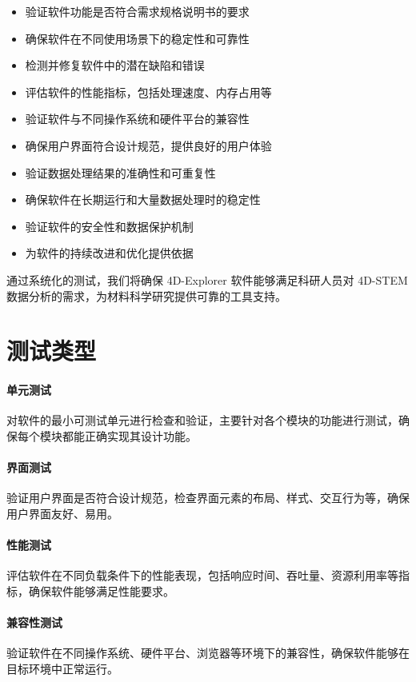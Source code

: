 \documentclass[a4paper,12pt]{report}	%
\begin{document}
\begin{itemize}
    \item 验证软件功能是否符合需求规格说明书的要求
    \item 确保软件在不同使用场景下的稳定性和可靠性
    \item 检测并修复软件中的潜在缺陷和错误
    \item 评估软件的性能指标，包括处理速度、内存占用等
    \item 验证软件与不同操作系统和硬件平台的兼容性
    \item 确保用户界面符合设计规范，提供良好的用户体验
    \item 验证数据处理结果的准确性和可重复性
    \item 确保软件在长期运行和大量数据处理时的稳定性
    \item 验证软件的安全性和数据保护机制
    \item 为软件的持续改进和优化提供依据
\end{itemize}

通过系统化的测试，我们将确保 4D-Explorer 软件能够满足科研人员对 4D-STEM 数据分析的需求，为材料科学研究提供可靠的工具支持。


\section{测试类型}

\paragraph{单元测试}
对软件的最小可测试单元进行检查和验证，主要针对各个模块的功能进行测试，确保每个模块都能正确实现其设计功能。

\paragraph{界面测试}
验证用户界面是否符合设计规范，检查界面元素的布局、样式、交互行为等，确保用户界面友好、易用。

\paragraph{性能测试}
评估软件在不同负载条件下的性能表现，包括响应时间、吞吐量、资源利用率等指标，确保软件能够满足性能要求。

\paragraph{兼容性测试}
验证软件在不同操作系统、硬件平台、浏览器等环境下的兼容性，确保软件能够在目标环境中正常运行。
\end{document}
